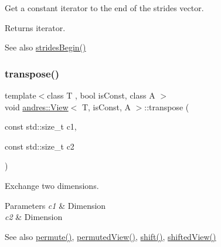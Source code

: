 Get a constant iterator to the end of the strides vector.

\begin{DoxyReturn}{Returns}
iterator. 
\end{DoxyReturn}
\begin{DoxySeeAlso}{See also}
\hyperlink{classandres_1_1View_aae2009aeccd7029a7c31767764d09677}{strides\+Begin()} 
\end{DoxySeeAlso}
\mbox{\label{classandres_1_1View_a3a837dd20fda8c536f9c76894a1f5944}} 
\subsubsection{\texorpdfstring{transpose()}{transpose()}\hspace{0.1cm}{\footnotesize\ttfamily [1/2]}}
{\footnotesize\ttfamily template$<$class T , bool is\+Const, class A $>$ \\
void \hyperlink{classandres_1_1View}{andres\+::\+View}$<$ T, is\+Const, A $>$\+::transpose (\begin{DoxyParamCaption}\item[{const std\+::size\+\_\+t}]{c1,  }\item[{const std\+::size\+\_\+t}]{c2 }\end{DoxyParamCaption})}

Exchange two dimensions.


\begin{DoxyParams}{Parameters}
{\em c1} & Dimension \\
\hline
{\em c2} & Dimension \\
\hline
\end{DoxyParams}
\begin{DoxySeeAlso}{See also}
\hyperlink{classandres_1_1View_a375d3e199e219568d8a6205e4088289b}{permute()}, \hyperlink{classandres_1_1View_ad5ff9254de815d85b6c6748bad3fcd89}{permuted\+View()}, \hyperlink{classandres_1_1View_a476957393b3b21333bc665e852da47ad}{shift()}, \hyperlink{classandres_1_1View_abc938823dc964548f0f44ab10bca6b59}{shifted\+View()} 
\end{DoxySeeAlso}
\mbox{\label{classandres_1_1View_ad7acad354a5be4086b9b21ab88b18d82}} 
